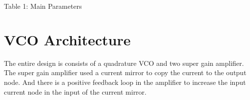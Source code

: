 \documentclass[]{article}
\begin{document}
\begin{center}
    Table 1: Main Parameters 
\end{center}

\section{VCO Architecture}
The entire design is consists of a quadrature VCO and two super gain amplifier.
The super gain amplifier used a current mirror to copy the current to the output
node. And there is a positive feedback loop in the amplifier to increase the
input current node in the input of the current mirror.
\end{document}
